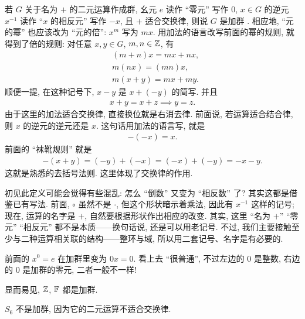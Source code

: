 \begin{definition}
    若 $G$ 关于名为 $+$ 的二元运算作成群, 幺元 $e$ 读作 ``零元'' 写作 $0$, $x \in G$ 的逆元 $x^{-1}$ 读作 ``$x$ 的相反元'' 写作 $-x$, 且 $+$ 适合交换律, 则说 $G$ 是加群 . 相应地, ``元的幂'' 也应该改为 ``元的倍'': $x^m$ 写为 $mx$. 用加法的语言改写前面的幂的规则, 就得到了倍的规则: 对任意 $x,y \in G$, $m,n \in \mathbb{Z}$, 有
    \begin{align*}
         & (m+n)x = mx + nx, \\
         & m(nx) = (mn)x,    \\
         & m(x+y) = mx + my.
    \end{align*}
    顺便一提, 在这种记号下, $x-y$ 是 $x+(-y)$ 的简写. 并且
    \begin{align*}
        x + y = x + z \implies y = z.
    \end{align*}
    由于这里的加法适合交换律, 直接换位就是右消去律. 前面说, 若运算适合结合律, 则 $x$ 的逆元的逆元还是 $x$. 这句话用加法的语言写, 就是
    \begin{align*}
        -(-x) = x.
    \end{align*}
    前面的 ``袜靴规则'' 就是
    \begin{align*}
        -(x+y) = (-y) + (-x) = (-x) + (-y) = -x-y.
    \end{align*}
    这就是熟悉的去括号法则. 这里体现了交换律的作用.
\end{definition}

\begin{remark}
    初见此定义可能会觉得有些混乱: 怎么 ``倒数'' 又变为 ``相反数'' 了? 其实这都是借鉴已有写法. 前面, $\circ$ 虽然不是 $\cdot$, 但这个形状暗示着乘法, 因此有 $x^{-1}$ 这样的记号; 现在, 运算的名字是 $+$, 自然要根据形状作出相应的改变. 其实, 这里 ``名为 $+$'' ``零元'' ``相反元'' 都不是本质——换句话说, 还是可以用老记号. 不过, 我们主要接触至少与二种运算相关联的结构——整环与域, 所以用二套记号、名字是有必要的.
\end{remark}

\begin{remark}
    前面的 $x^0 = e$ 在加群里变为 $0x = 0$. 看上去 ``很普通'', 不过左边的 $0$ 是整数, 右边的 $0$ 是加群的零元, 二者一般不一样!
\end{remark}

\begin{example}
    显而易见, $\mathbb{Z}$, $\mathbb{F}$ 都是加群.
\end{example}

\begin{example}
    $S_6$ 不是加群, 因为它的二元运算不适合交换律.
\end{example}

